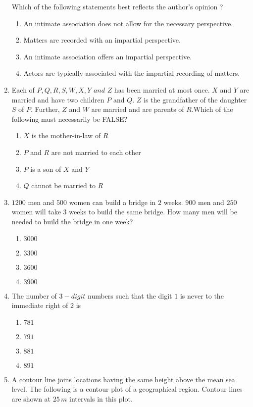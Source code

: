 \documentclass[journal]{IEEEtran}
\begin{document}
\begin{enumerate}
    Which of the following statements best reflects the author's opinion ?
    \begin{enumerate}
        \item An intimate association does not allow for the necessary perspective.
        \item Matters are recorded with an impartial perspective.
        \item An intimate association offers an impartial perspective.
        \item Actors are typically associated with the impartial recording of matters.
    \end{enumerate}
    \item Each of $P,Q,R,S,W,X,Y\,\,and\,\,Z$ has been married at most once. $X$ and $Y$ are married and have two children $P$ and $Q$. $Z$ is the grandfather of the daughter $S$ of $P$. Further,  $Z$ and $W$ are married and are parents of $R$.Which of the following must necessarily be FALSE?
    \begin{enumerate}
        \item $X$ is the mother-in-law of $R$
        \item $P$ and $R$ are not married to each other
        \item $P$ is a son of $X$ and $Y$
        \item $Q$ cannot be married to $R$
    \end{enumerate}
    \item $1200$ men and $500$ women can build a bridge in $2$ weeks. $900$ men and $250$ women will take $3$ weeks to build the same bridge. How many men will be needed to build the bridge in one week?
    \begin{enumerate}
        \item $3000$
        \item $3300$
        \item $3600$
        \item $3900$
    \end{enumerate}
    \item The number of $3-digit$ numbers such that the digit $1$ is never to the immediate right of $2$ is 
    \begin{enumerate}
        \item $781$
        \item $791$
        \item $881$
        \item $891$
    \end{enumerate}
    \item A contour line joins locations having the same height above the mean sea level. The following is a contour plot of a geographical region. Contour lines are shown at $25\,m$ intervals in this plot.
    

\end{enumerate}
\end{document}
